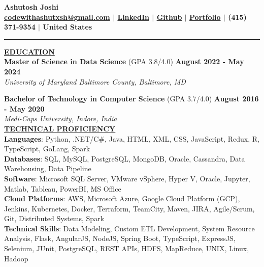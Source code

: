 \documentclass{article}
\begin{document}
\begin{center}
\thispagestyle{empty}
\large \textbf{Ashutosh Joshi \\}
\normalsize \textbf{\href{mailto:codewithashutxsh@gmail.com}{codewithashutxsh@gmail.com} $\mid$ \href{https://www.linkedin.com/in/ashutosh--joshi/}{LinkedIn} $\mid$ \href{https://github.com/ashutoshjoshi1}{Github} $\mid$ \href{https://ashutoshjoshi1.github.io/Portfolio/}{Portfolio} $\mid$ (415) 371-9354 $\mid$ United States \\}
\rule{\textwidth}{1pt}
\end{center}

\noindent \textbf{\underline{EDUCATION}} \\
\textbf{Master of Science in Data Science} (GPA 3.8/4.0)  \hfill \textbf{August 2022 - May 2024} \\
\textit{University of Maryland Baltimore County, Baltimore, MD}\\
\begin{itemize}[noitemsep,nolistsep,leftmargin=*]
\end{itemize}
\textbf{Bachelor of Technology in Computer Science} (GPA 3.7/4.0) \hfill \textbf{August 2016 - May 2020} \\
\textit{Medi-Caps University, Indore, India} \\

\noindent \textbf{\underline{TECHNICAL PROFICIENCY}} \\
\textbf{Languages}{: \small Python, .NET/C#, Java, HTML, XML, CSS, JavaScript, Redux, R, TypeScript, GoLang, Spark} \\
\textbf{Databases}{: \small SQL, MySQL, PostgreSQL, MongoDB, Oracle, Cassandra, Data Warehousing, Data Pipeline} \\
\textbf{Software}{: \small Microsoft SQL Server, VMware vSphere, Hyper V, Oracle, Jupyter, Matlab, Tableau, PowerBI, MS Office} \\
\textbf{Cloud Platforms}{: \small AWS, Microsoft Azure, Google Cloud Platform (GCP), Jenkins, Kubernetes, Docker, Terraform, TeamCity, Maven, JIRA, Agile/Scrum, Git, Distributed Systems, Spark} \\
\textbf{Technical Skills}{: \small Data Modeling, Custom ETL Development, System Resource Analysis, Flask, AngularJS, NodeJS, Spring Boot, TypeScript, ExpressJS, Selenium, JUnit, PostgreSQL, REST APIs, HDFS, MapReduce, UNIX, Linux, Hadoop} \\
\end{document}
